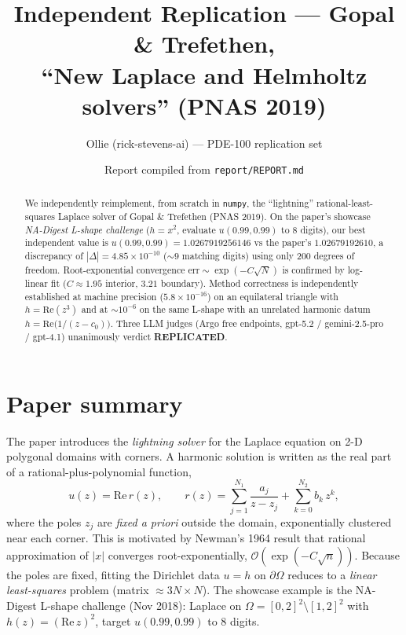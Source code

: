 \documentclass[11pt]{article}
\title{Independent Replication --- Gopal \& Trefethen,\\
``New Laplace and Helmholtz solvers'' (PNAS 2019)}
\author{Ollie (rick-stevens-ai) --- PDE-100 replication set}
\date{Report compiled from \texttt{report/REPORT.md}}
\begin{document}
\maketitle

\begin{abstract}
We independently reimplement, from scratch in \texttt{numpy}, the ``lightning''
rational-least-squares Laplace solver of Gopal \& Trefethen (PNAS 2019). On the
paper's showcase \emph{NA-Digest L-shape challenge} ($h=x^2$, evaluate $u(0.99,0.99)$
to 8 digits), our best independent value is
$u(0.99,0.99)=1.0267919256146$ vs the paper's $1.02679192610$, a discrepancy of
$|\Delta|=4.85\times 10^{-10}$ ($\sim 9$ matching digits) using only 200 degrees
of freedom. Root-exponential convergence
$\text{err}\sim\exp(-C\sqrt{N})$ is confirmed by log-linear fit
($C\approx 1.95$ interior, $3.21$ boundary). Method correctness is
independently established at machine precision ($5.8\times 10^{-16}$) on an
equilateral triangle with $h=\mathrm{Re}(z^3)$ and at $\sim 10^{-6}$ on the same
L-shape with an unrelated harmonic datum $h=\mathrm{Re}\bigl(1/(z-c_0)\bigr)$.
Three LLM judges (Argo free endpoints, gpt-5.2 / gemini-2.5-pro / gpt-4.1)
unanimously verdict \textbf{REPLICATED}.
\end{abstract}

\section{Paper summary}
The paper introduces the \emph{lightning solver} for the Laplace equation on
2-D polygonal domains with corners. A harmonic solution is written as the real
part of a rational-plus-polynomial function,
\[
  u(z) = \mathrm{Re}\, r(z),
  \qquad
  r(z) = \sum_{j=1}^{N_1}\frac{a_j}{z-z_j}
       + \sum_{k=0}^{N_2} b_k\, z^k,
\]
where the poles $z_j$ are \emph{fixed a priori} outside the domain, exponentially
clustered near each corner. This is motivated by Newman's 1964 result that
rational approximation of $|x|$ converges root-exponentially,
$\mathcal{O}(\exp(-C\sqrt{n}))$. Because the poles are fixed, fitting the
Dirichlet data $u=h$ on $\partial\Omega$ reduces to a
\emph{linear least-squares} problem (matrix $\approx 3N\times N$). The
showcase example is the NA-Digest L-shape challenge (Nov 2018):
Laplace on $\Omega=[0,2]^2\setminus[1,2]^2$ with $h(z)=(\mathrm{Re}\,z)^2$,
target $u(0.99,0.99)$ to 8 digits.
\end{document}
